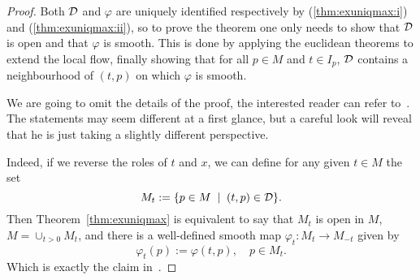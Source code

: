 \begin{proof}
  Both $\mathcal{D}$ and $\varphi$ are uniquely identified respectively by (\ref{thm:exuniqmax:i}) and (\ref{thm:exuniqmax:ii}), so to prove the theorem one only needs to show that $\mathcal{D}$ is open and that $\varphi$ is smooth.
  This is done by applying the euclidean theorems to extend the local flow, finally showing that for all $p\in M$ and $t\in I_p$, $\mathcal{D}$ contains a neighbourhood of $(t,p)$ on which $\varphi$ is smooth.

  We are going to omit the details of the proof, the interested reader can refer to~\cite[Proposition 9.12]{book:lee}.
  The statements may seem different at a first glance, but a careful look will reveal that he is just taking a slightly different perspective.

  Indeed, if we reverse the roles of $t$ and $x$, we can define for any given $t\in M$ the set
  \begin{equation}
    M_t := \{p\in M \;\mid\; (t,p)\in\mathcal{D}\}.
  \end{equation}
  Then Theorem~\ref{thm:exuniqmax} is equivalent to say that $M_t$ is open in $M$, $M = \cup_{t>0} M_t$, and there is a well-defined smooth map $\varphi_t : M_t \to M_{-t}$ given by
  \begin{equation}\label{eq:flowdiffeo}
    \varphi_t(p) := \varphi(t,p), \quad p\in M_t.
  \end{equation}
  Which is exactly the claim in~\cite[Proposition 9.12]{book:lee}.





\end{proof}
